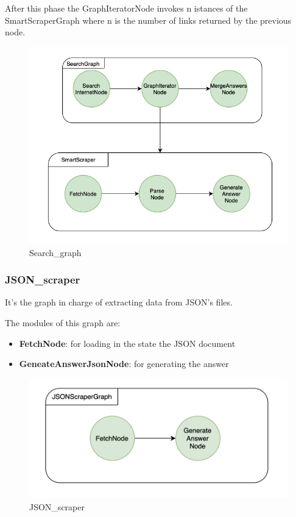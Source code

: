 After this phase the GraphIteratorNode invokes n istances of the SmartScraperGraph where n is the number of links returned by the previous node.
\begin{figure}[h!]
    \centering
    \includegraphics[width=1\linewidth]{Assets/search_graph.png}
    \caption{Search\_graph}
    \label{fig:enter-label}
\end{figure}
\subsubsection{JSON\_scraper}
It's the graph in charge of extracting data from JSON's files.

The modules of this graph are: 
\begin{itemize}
    \item \textbf{FetchNode}: for loading in the state the JSON document 
    \item \textbf{GeneateAnswerJsonNode}: for generating the answer 
\end{itemize}

\begin{figure}[h!]
    \centering
    \includegraphics[width=0.75\linewidth]{Assets/json_scraper.png}
    \caption{JSON\_scraper}
    \label{fig:json_scraper}
\end{figure}
